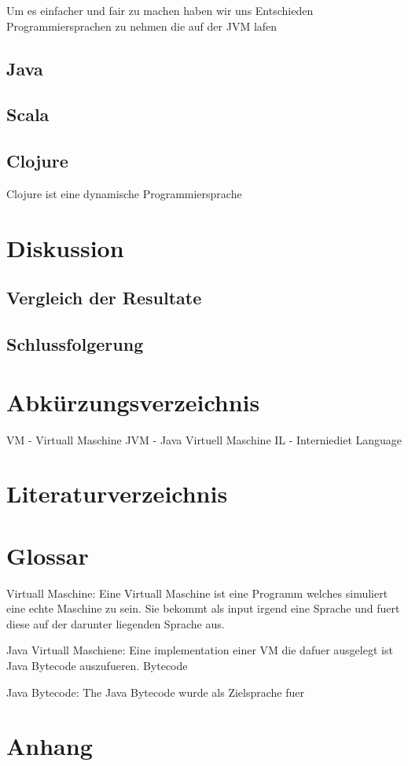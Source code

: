 \documentclass{fancydocument}
\begin{document}
Um es einfacher und fair zu machen haben wir uns Entschieden
Programmiersprachen zu nehmen die auf der JVM lafen

\subsection{Java}
\subsection{Scala}
\subsection{Clojure}

Clojure ist eine dynamische Programmiersprache 

\section{Diskussion}
\subsection{Vergleich der Resultate}
\subsection{Schlussfolgerung}
\section{Abk\"urzungsverzeichnis}

VM  - Virtuall Maschine
JVM - Java Virtuell Maschine
IL - Interniediet Language

\section{Literaturverzeichnis}
\section{Glossar}

Virtuall Maschine: Eine Virtuall Maschine ist eine Programm welches simuliert eine echte
Maschine zu sein. Sie bekommt als input irgend eine Sprache und fuert
diese auf der darunter liegenden Sprache aus.

Java Virtuall Maschiene: Eine implementation einer VM die dafuer ausgelegt ist Java Bytecode auszufueren.
Bytecode

Java Bytecode: The Java Bytecode wurde als Zielsprache fuer 

\section{Anhang}
\end{document}
